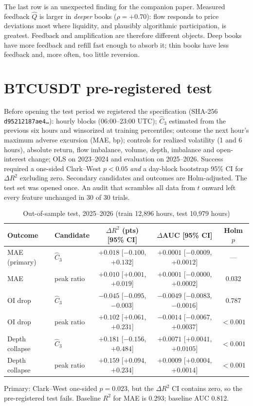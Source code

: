 \documentclass[12pt]{article}
\theoremstyle{definition}
\theoremstyle{remark}
\begin{document}
The last row is an unexpected finding for the companion paper. Measured feedback $\hat Q$ is larger in \emph{deeper} books ($\rho=+0.70$): flow responds to price deviations most where liquidity, and plausibly algorithmic participation, is greatest. Feedback and amplification are therefore different objects. Deep books have more feedback and refill fast enough to absorb it; thin books have less feedback and, more often, too little reversion.

\section{BTCUSDT pre-registered test}
Before opening the test period we registered the specification (SHA-256 \texttt{d95212187ae4\ldots}): hourly blocks (06:00--23:00 UTC); $\hat C_3$ estimated from the previous six hours and winsorized at training percentiles; outcome the next hour's maximum adverse excursion (MAE, bp); controls for realized volatility (1 and 6 hours), absolute return, flow imbalance, volume, depth, imbalance and open-interest change; OLS on 2023--2024 and evaluation on 2025--2026. Success required a one-sided Clark--West $p<0.05$ \emph{and} a day-block bootstrap 95\% CI for $\Delta R^2$ excluding zero. Secondary candidates and outcomes are Holm-adjusted. The test set was opened once. An audit that scrambles all data from $t$ onward left every feature unchanged in 30 of 30 trials.

\begin{table}[t]\centering
\begin{threeparttable}
\caption{Out-of-sample test, 2025--2026 (train 12,896 hours, test 10,979 hours)}\label{tab:d8}
\small\setlength{\tabcolsep}{4pt}
\begin{tabular}{llccc}
\toprule
Outcome & Candidate & $\Delta R^2$ (pts) [95\% CI] & $\Delta$AUC [95\% CI] & Holm $p$\\
\midrule
MAE (primary) & $\hat C_3$ & $+0.018$ [$-0.100$, $+0.132$] & $+0.0001$ [$-0.0009$, $+0.0012$] & ---\\
MAE & peak ratio & $+0.010$ [$+0.001$, $+0.019$] & $+0.0001$ [$-0.0000$, $+0.0002$] & 0.032\\
OI drop & $\hat C_3$ & $-0.045$ [$-0.095$, $-0.003$] & $-0.0049$ [$-0.0083$, $-0.0016$] & 0.787\\
OI drop & peak ratio & $+0.102$ [$+0.061$, $+0.231$] & $-0.0014$ [$-0.0067$, $+0.0037$] & $<0.001$\\
Depth collapse & $\hat C_3$ & $+0.181$ [$-0.156$, $+0.484$] & $+0.0071$ [$+0.0041$, $+0.0105$] & $<0.001$\\
Depth collapse & peak ratio & $+0.159$ [$+0.094$, $+0.234$] & $+0.0009$ [$+0.0004$, $+0.0014$] & $<0.001$\\
\bottomrule
\end{tabular}
\begin{tablenotes}\footnotesize\item Primary: Clark--West one-sided $p=0.023$, but the $\Delta R^2$ CI contains zero, so the pre-registered test fails. Baseline $R^2$ for MAE is 0.293; baseline AUC 0.812. \end{tablenotes}
\end{threeparttable}
\end{table}
\end{document}
